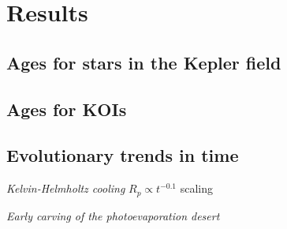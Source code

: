 \documentclass[11pt,twocolumn,tighten]{aastex63}
\begin{document}
\section{Results}
\label{sec:results}

\subsection{Ages for stars in the Kepler field}


%


\subsection{Ages for KOIs}

\subsection{Evolutionary trends in time}

{\it Kelvin-Helmholtz cooling}
$R_p \propto t^{-0.1}$ scaling \citep{Gupta_2019}

{\it Early carving of the photoevaporation desert}
\citep{Owen_Lai_2018}
\end{document}

